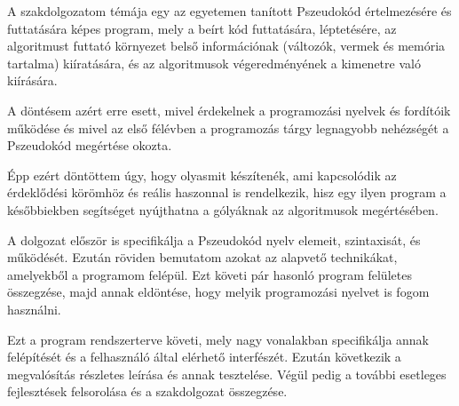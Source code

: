 A szakdolgozatom témája egy az egyetemen tanított Pszeudokód értelmezésére és futtatására képes program, mely a beírt kód futtatására, léptetésére, az algoritmust futtató környezet belső információnak (változók, vermek és memória tartalma) kiíratására, és az algoritmusok végeredményének a kimenetre való kiírására.

A döntésem azért erre esett, mivel érdekelnek a programozási nyelvek és fordítóik működése és mivel az első félévben a programozás tárgy legnagyobb nehézségét a Pszeudokód megértése okozta.

Épp ezért döntöttem úgy, hogy olyasmit készítenék, ami kapcsolódik az érdeklődési körömhöz és reális haszonnal is rendelkezik, hisz egy ilyen program a későbbiekben segítséget nyújthatna a gólyáknak az algoritmusok megértésében.

A dolgozat először is specifikálja a Pszeudokód nyelv elemeit, szintaxisát, és működését. Ezután röviden bemutatom azokat az alapvető technikákat, amelyekből a programom felépül. Ezt követi pár hasonló program felületes összegzése, majd annak eldöntése, hogy melyik programozási nyelvet is fogom használni.

Ezt a program rendszerterve követi, mely nagy vonalakban specifikálja annak felépítését és a felhasználó által elérhető interfészét. Ezután következik a megvalósítás részletes leírása és annak tesztelése. Végül pedig a további esetleges fejlesztések felsorolása és a szakdolgozat összegzése.